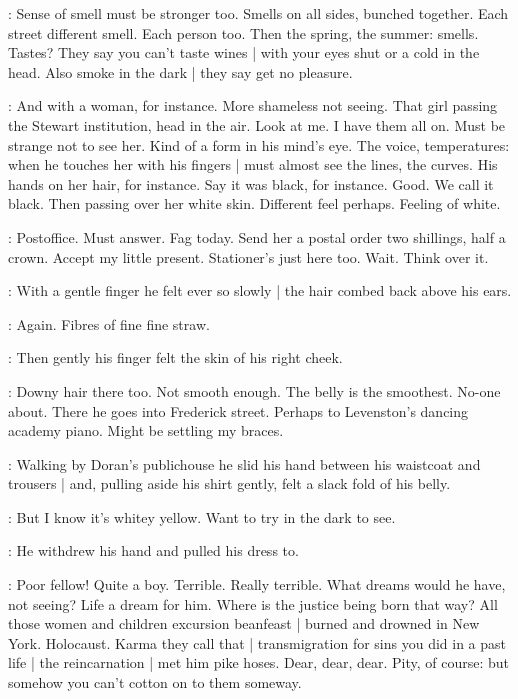 \BloomInt:
Sense of smell must be stronger too.
Smells on all sides, bunched together.
Each street different smell.
Each person too.
Then the spring, the summer:
smells.
Tastes?
They say you can't taste wines |
with your eyes shut or a cold in the head.
Also smoke in the dark |
they say get no pleasure.

\BloomInt:
And with a woman, for instance.
More shameless not seeing.
That girl passing the Stewart institution,
head in the air.
Look at me.
I have them all on.
Must be strange not to see her.
Kind of a form in his mind's eye.
The voice, temperatures:
when he touches her with his fingers |
must almost see the lines, the curves.
His hands on her hair, for instance.
Say it was black, for instance.
Good.
We call it black.
Then passing over her white skin.
Different feel perhaps.
Feeling of white.

\BloomInt:
Postoffice.
Must answer.
Fag today.
Send her a postal order
two shillings, half a crown.
Accept my little present.
Stationer's just here too.
Wait.
Think over it.

:
With a gentle finger
he felt ever so slowly |
the hair combed back above his ears.

\BloomInt:
Again.
Fibres of fine fine straw.

:
Then gently his finger felt
the skin of his right cheek.

\BloomInt:
Downy hair there too.
Not smooth enough.
The belly is the smoothest.
No-one about.
There he goes into Frederick street.
Perhaps to Levenston's dancing academy piano.
Might be settling my braces.

:
Walking by Doran's publichouse
he slid his hand between his waistcoat and trousers |
and, pulling aside his shirt gently,
felt a slack fold of his belly.

\BloomInt:
But I know it's whitey yellow.
Want to try in the dark to see.

:
He withdrew his hand and pulled his dress to.

\BloomInt:
Poor fellow!
Quite a boy.
Terrible.
Really terrible.
What dreams would he have,
not seeing?
Life a dream for him.
Where is the justice being born that way?
All those women and children excursion beanfeast |
burned and drowned in New York.
Holocaust.
Karma they call that |
transmigration for sins you did in a past life |
the reincarnation |
met him pike hoses.
Dear, dear, dear.
Pity, of course:
but somehow you can't cotton on to them someway.%

